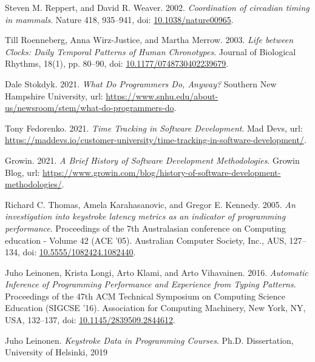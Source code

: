 \begin{thebibliography}{99}

 Steven M. Reppert, and David R. Weaver. 2002. \textit{Coordination of circadian timing in mammals}. Nature 418, 935–941, doi: \href{https://doi.org/10.1038/nature00965}{10.1038/nature00965}.

 Till Roenneberg, Anna Wirz-Justice, and Martha Merrow. 2003. \textit{Life between Clocks: Daily Temporal Patterns of Human Chronotypes}. Journal of Biological Rhythms, 18(1), pp. 80–90, doi: \href{https://doi.org/10.1177/0748730402239679}{10.1177/0748730402239679}.

 Dale Stokdyk. 2021. \textit{What Do Programmers Do, Anyway?} Southern New Hampshire University, url: \url{https://www.snhu.edu/about-us/newsroom/stem/what-do-programmers-do}.

 Tony Fedorenko. 2021. \textit{Time Tracking in Software Development}. Mad Devs, url: \url{https://maddevs.io/customer-university/time-tracking-in-software-development/}.

 Growin. 2021. \textit{A Brief History of Software Development Methodologies}. Growin Blog, url: \url{https://www.growin.com/blog/history-of-software-development-methodologies/}.

 Richard C. Thomas, Amela Karahasanovic, and Gregor E. Kennedy. 2005. \textit{An investigation into keystroke latency metrics as an indicator of programming performance}. Proceedings of the 7th Australasian conference on Computing education - Volume 42 (ACE '05). Australian Computer Society, Inc., AUS, 127–134, doi: \href{https://dl.acm.org/doi/10.5555/1082424.1082440}{10.5555/1082424.1082440}.

 Juho Leinonen, Krista Longi, Arto Klami, and Arto Vihavainen. 2016. \textit{Automatic Inference of Programming Performance and Experience from Typing Patterns}. Proceedings of the 47th ACM Technical Symposium on Computing Science Education (SIGCSE '16). Association for Computing Machinery, New York, NY, USA, 132–137, doi: \href{https://doi.org/10.1145/2839509.2844612}{10.1145/2839509.2844612}.


 Juho Leinonen. \textit{Keystroke Data in Programming Courses}. Ph.D. Dissertation, University of Helsinki, 2019


\end{thebibliography}
